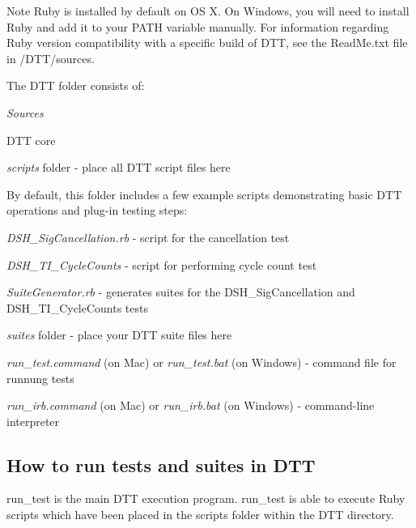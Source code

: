 \begin{DoxyNote}{Note}
Ruby is installed by default on O\+S X. On Windows, you will need to install Ruby and add it to your P\+A\+T\+H variable manually. For information regarding Ruby version compatibility with a specific build of D\+T\+T, see the Read\+Me.\+txt file in /\+D\+T\+T/sources.
\end{DoxyNote}
The D\+T\+T folder consists of\+: 
\begin{DoxyItemize}
\item {\itshape Sources} 
\begin{DoxyItemize}
\item D\+T\+T core 
\item {\itshape scripts} folder -\/ place all D\+T\+T script files here

By default, this folder includes a few example scripts demonstrating basic D\+T\+T operations and plug-\/in testing steps\+:


\begin{DoxyItemize}
\item {\itshape D\+S\+H\+\_\+\+Sig\+Cancellation.\+rb} -\/ script for the cancellation test  
\item {\itshape D\+S\+H\+\_\+\+T\+I\+\_\+\+Cycle\+Counts} -\/ script for performing cycle count test 
\item {\itshape Suite\+Generator.\+rb} -\/ generates suites for the D\+S\+H\+\_\+\+Sig\+Cancellation and D\+S\+H\+\_\+\+T\+I\+\_\+\+Cycle\+Counts tests 
\end{DoxyItemize}
\item {\itshape suites} folder -\/ place your D\+T\+T suite files here 
\end{DoxyItemize}
\item {\itshape run\+\_\+test.\+command} (on Mac) or {\itshape run\+\_\+test.\+bat} (on Windows) -\/ command file for runnung tests 
\item {\itshape run\+\_\+irb.\+command} (on Mac) or {\itshape run\+\_\+irb.\+bat} (on Windows) -\/ command-\/line interpreter 
\end{DoxyItemize}

 \hypertarget{a00366_dtt_guide_01_how_to_run_test_and_suites_in_dtt}{}\subsection{How to run tests and suites in D\+T\+T}\label{a00366_dtt_guide_01_how_to_run_test_and_suites_in_dtt}
 {\ttfamily run\+\_\+test} is the main D\+T\+T execution program. {\ttfamily run\+\_\+test} is able to execute Ruby scripts which have been placed in the scripts folder within the D\+T\+T directory.


